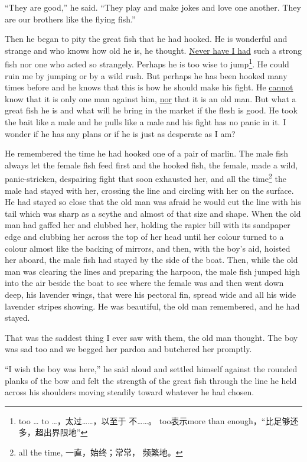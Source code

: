``They are good,'' he said. ``They play and make jokes and love one another.
They are our brothers like the flying fish.''

Then he began to pity the great fish that he had hooked. He is wonderful and
strange and who knows how old he is, he thought. \uline{Never have I had}
such a strong fish nor one who \gls{acted} so strangely. Perhaps he is too
\gls{wise} to jump\footnote{too \ldots{} to \ldots{}，太过……，以至于
  不……。 too表示more than enough，“比足够还多，超出界限地”}. He could
\gls{ruin} me by jumping or by a wild rush. But perhaps he has been hooked
many times before and he knows that this is how he should make his fight. He
\uline{cannot} know that it is only one man against him, \uline{nor} that it
is an old man. But what a great fish he is and what will he bring in the
market if the flesh is good. He took the bait like a male and he pulls like
a male and his fight has no panic in it. I wonder if he has any plans or if
he is just as \gls{desperate} as I am?

He remembered the time he had hooked one of a pair of marlin. The male fish
always let the female fish feed first and the hooked fish, the female, made
a wild, panic-\gls{stricken}, \gls{despairing} fight that soon
\gls{exhausted} her, and all the time\footnote{all the time, 一直，始终；常常，
  频繁地。} the male had stayed with her, crossing the line and circling
with her on the surface. He had stayed so close that the old man was afraid
he would cut the line with his tail which was sharp as a \gls{scythe} and
almost of that size and shape. When the old man had gaffed her and clubbed
her, holding the \gls{rapier} \gls{bill} with its \gls{sandpaper} edge and
clubbing her across the top of her head until her colour turned to a colour
almost like the backing of mirrors, and then, with the boy's aid, hoisted
her aboard, the male fish had stayed by the side of the boat. Then, while
the old man was clearing the lines and preparing the harpoon, the male fish
jumped high into the air beside the boat to see where the female was and
then went down deep, his \gls{lavender} wings, that were his \gls{pectoral} fin, spread wide and all his wide lavender \glspl{stripe} showing. He was
beautiful, the old man remembered, and he had stayed.


That was the saddest thing I ever saw with them, the old man thought. The
boy was sad too and we begged her pardon and butchered her \gls{promptly}.

``I wish the boy was here,'' he said aloud and \gls{settled} himself against
the rounded planks of the bow and felt the strength of the great fish
through the line he held across his shoulders moving steadily toward
whatever he had chosen.

